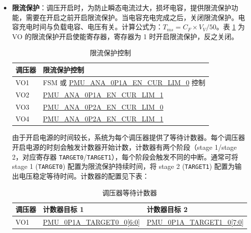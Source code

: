 \documentclass[main\_\_CN.tex]{subfiles}
\begin{document}
\begin{itemize}
\item \textbf{限流保护}：调压开启时，为防止瞬态电流过大，损坏电容，提供限流保护功能，需要在开启之前开启限流保护。当电容充电完成之后，关闭限流保护。电容充电时间与负载电容、电压有关。计算公式为：$T_{ms} = C_{F} × V_{V}/50$。表 \ref{tab:lowpowm-vo-lim-prot} 为 VO 的限流保护开启使能寄存器，寄存器为 1 时开启限流保护，反之关闭。

    \begin{table}[H]
    \small
    \centering
    \caption{限流保护控制}
    \label{tab:lowpowm-vo-lim-prot}
    \begin{threeparttable}
    \begin{tabular}{|l|l|}
    \hline
    \rowcolor{lightgray}
    调压器 & 限流保护控制\\\hline

    VO1	& FSM 或 \hyperref[fielddesc:PMUANA0P1AENCURLIM0]{PMU\_ANA\_0P1A\_EN\_CUR\_LIM\_0} 控制\\\hline

    VO2	& \hyperref[fielddesc:PMUANA0P1AENCURLIM1]{PMU\_ANA\_0P1A\_EN\_CUR\_LIM\_1}\\\hline

    VO3	& \hyperref[fielddesc:PMUANA0P2AENCURLIM0]{PMU\_ANA\_0P2A\_EN\_CUR\_LIM\_0}\\\hline

    VO4	& \hyperref[fielddesc:PMUANA0P2AENCURLIM1]{PMU\_ANA\_0P2A\_EN\_CUR\_LIM\_1}\\\hline
    \end{tabular}
    \end{threeparttable}
    \end{table}

由于开启电源的时间较长，系统为每个调压器提供了等待计数器。每个调压器开启电源的时刻会触发计数器开始计数，计数器有两个阶段（stage 1/stage 2，对应寄存器 \texttt{TARGET0}/\texttt{TARGET1}），每个阶段会触发不同的中断。通常可将 stage 1 (\texttt{TARGET0}) 配置为限流保护持续时间，将 stage 2 (\texttt{TARGET1}) 配置为输出电压稳定等待时间。计数器的配置见下表：

    \begin{table}[H]
    \small
    \centering
    \caption{调压器等待计数器}
    \label{tab:lowpowm-target}
    \begin{threeparttable}
    \begin{tabular}{|l|l|l|}
    \hline
    \rowcolor{lightgray}
    调压器 & 计数器目标 1 & 计数器目标 2\\\hline

    VO1	& \hyperref[fielddesc:PMU0P1ATARGET00]{PMU\_0P1A\_TARGET0\_0[6:0]} & \hyperref[fielddesc:PMU0P1ATARGET10]{PMU\_0P1A\_TARGET1\_0[7:0]}\\\hline


\end{tabular}
\end{threeparttable}
\end{table}
\end{itemize}
\end{document}
